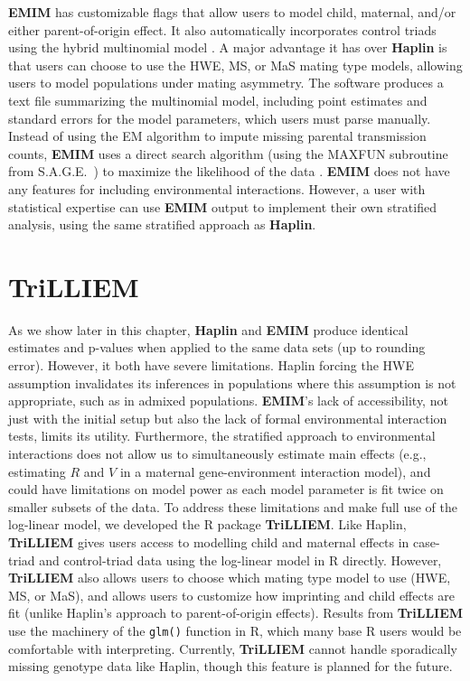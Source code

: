 \textbf{EMIM} has customizable flags that allow users to model child, maternal, and/or either parent-of-origin effect.
It also automatically incorporates control triads using the hybrid multinomial model \cite{WeinUmba05}.
A major advantage it has over \textbf{Haplin} is that users can choose to use the HWE, MS, or MaS mating type models, allowing users to model populations under mating asymmetry.
The software produces a text file summarizing the multinomial model, including point estimates and standard errors for the model parameters, which users must parse manually.
Instead of using the EM algorithm to impute missing parental transmission counts, \textbf{EMIM} uses a direct search algorithm (using the MAXFUN subroutine from S.A.G.E.~\cite{Sage21}) to maximize the likelihood of the data \cite{HoweCord12}.
\textbf{EMIM} does not have any features for including environmental interactions.
However, a user with statistical expertise can use \textbf{EMIM} output to implement their own stratified analysis, using the same stratified approach as \textbf{Haplin}.

\section{TriLLIEM}

As we show later in this chapter, \textbf{Haplin} and \textbf{EMIM} produce identical estimates and p-values when applied to the same data sets (up to rounding error).
However, it both have severe limitations.
Haplin forcing the HWE assumption invalidates its inferences in populations where this assumption is not appropriate, such as in admixed populations.
\textbf{EMIM}'s lack of accessibility, not just with the initial setup but also the lack of formal environmental interaction tests, limits its utility.
Furthermore, the stratified approach to environmental interactions does not allow us to simultaneously estimate main effects (e.g., estimating $R$ and $V$ in a maternal gene-environment interaction model), and could have limitations on model power as each model parameter is fit twice on smaller subsets of the data.
To address these limitations and make full use of the log-linear model, we developed the R package \textbf{TriLLIEM}.
Like Haplin, \textbf{TriLLIEM} gives users access to modelling child and maternal effects in case-triad and control-triad data using the log-linear model in R directly.
However, \textbf{TriLLIEM} also allows users to choose which mating type model to use (HWE, MS, or MaS), and allows users to customize how imprinting and child effects are fit (unlike Haplin's approach to parent-of-origin effects).
Results from \textbf{TriLLIEM} use the machinery of the \texttt{glm()} function in R, which many base R users would be comfortable with interpreting.
Currently, \textbf{TriLLIEM} cannot handle sporadically missing genotype data like Haplin, though this feature is planned for the future.

